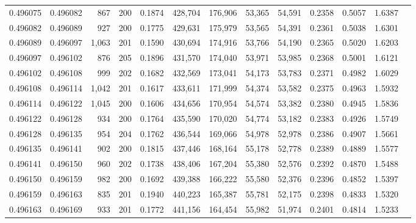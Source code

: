 \begin{tabular}{rrrrrrrrrrrrr}
0.496075 & 0.496082 &   867 & 200 &                                     0.1874 & 428,704 & 176,906 &  53,365 &  54,591 & 0.2358 & 0.5057 & 1.6387 \\
0.496082 & 0.496089 &   927 & 200 &                                     0.1775 & 429,631 & 175,979 &  53,565 &  54,391 & 0.2361 & 0.5038 & 1.6301 \\
0.496089 & 0.496097 & 1,063 & 201 &                                     0.1590 & 430,694 & 174,916 &  53,766 &  54,190 & 0.2365 & 0.5020 & 1.6203 \\
0.496097 & 0.496102 &   876 & 205 &                                     0.1896 & 431,570 & 174,040 &  53,971 &  53,985 & 0.2368 & 0.5001 & 1.6121 \\
0.496102 & 0.496108 &   999 & 202 &                                     0.1682 & 432,569 & 173,041 &  54,173 &  53,783 & 0.2371 & 0.4982 & 1.6029 \\
0.496108 & 0.496114 & 1,042 & 201 &                                     0.1617 & 433,611 & 171,999 &  54,374 &  53,582 & 0.2375 & 0.4963 & 1.5932 \\
0.496114 & 0.496122 & 1,045 & 200 &                                     0.1606 & 434,656 & 170,954 &  54,574 &  53,382 & 0.2380 & 0.4945 & 1.5836 \\
0.496122 & 0.496128 &   934 & 200 &                                     0.1764 & 435,590 & 170,020 &  54,774 &  53,182 & 0.2383 & 0.4926 & 1.5749 \\
0.496128 & 0.496135 &   954 & 204 &                                     0.1762 & 436,544 & 169,066 &  54,978 &  52,978 & 0.2386 & 0.4907 & 1.5661 \\
0.496135 & 0.496141 &   902 & 200 &                                     0.1815 & 437,446 & 168,164 &  55,178 &  52,778 & 0.2389 & 0.4889 & 1.5577 \\
0.496141 & 0.496150 &   960 & 202 &                                     0.1738 & 438,406 & 167,204 &  55,380 &  52,576 & 0.2392 & 0.4870 & 1.5488 \\
0.496150 & 0.496159 &   982 & 200 &                                     0.1692 & 439,388 & 166,222 &  55,580 &  52,376 & 0.2396 & 0.4852 & 1.5397 \\
0.496159 & 0.496163 &   835 & 201 &                                     0.1940 & 440,223 & 165,387 &  55,781 &  52,175 & 0.2398 & 0.4833 & 1.5320 \\
0.496163 & 0.496169 &   933 & 201 &                                     0.1772 & 441,156 & 164,454 &  55,982 &  51,974 & 0.2401 & 0.4814 & 1.5233 \\

\end{tabular}
